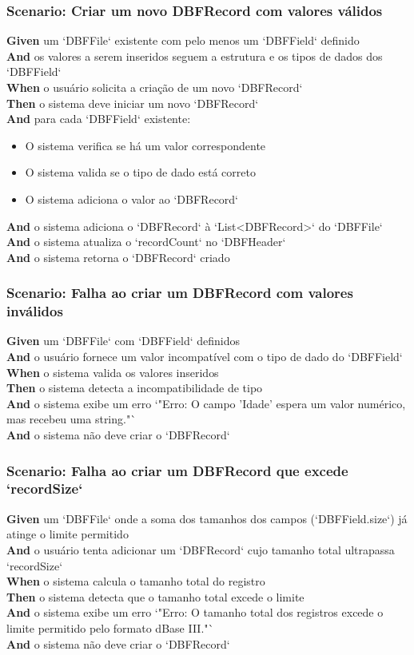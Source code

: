 \subsubsection{Scenario: Criar um novo DBFRecord com valores válidos}
\textbf{Given} um `DBFFile` existente com pelo menos um `DBFField` definido \\
\textbf{And} os valores a serem inseridos seguem a estrutura e os tipos de dados dos `DBFField` \\
\textbf{When} o usuário solicita a criação de um novo `DBFRecord` \\
\textbf{Then} o sistema deve iniciar um novo `DBFRecord` \\
\textbf{And} para cada `DBFField` existente:
\begin{itemize}
    \item O sistema verifica se há um valor correspondente
    \item O sistema valida se o tipo de dado está correto
    \item O sistema adiciona o valor ao `DBFRecord`
\end{itemize}
\textbf{And} o sistema adiciona o `DBFRecord` à `List<DBFRecord>` do `DBFFile` \\
\textbf{And} o sistema atualiza o `recordCount` no `DBFHeader` \\
\textbf{And} o sistema retorna o `DBFRecord` criado

\subsubsection{Scenario: Falha ao criar um DBFRecord com valores inválidos}
\textbf{Given} um `DBFFile` com `DBFField` definidos \\
\textbf{And} o usuário fornece um valor incompatível com o tipo de dado do `DBFField` \\
\textbf{When} o sistema valida os valores inseridos \\
\textbf{Then} o sistema detecta a incompatibilidade de tipo \\
\textbf{And} o sistema exibe um erro `"Erro: O campo 'Idade' espera um valor numérico, mas recebeu uma string."` \\
\textbf{And} o sistema não deve criar o `DBFRecord`

\subsubsection{Scenario: Falha ao criar um DBFRecord que excede `recordSize`}
\textbf{Given} um `DBFFile` onde a soma dos tamanhos dos campos (`DBFField.size`) já atinge o limite permitido \\
\textbf{And} o usuário tenta adicionar um `DBFRecord` cujo tamanho total ultrapassa `recordSize` \\
\textbf{When} o sistema calcula o tamanho total do registro \\
\textbf{Then} o sistema detecta que o tamanho total excede o limite \\
\textbf{And} o sistema exibe um erro `"Erro: O tamanho total dos registros excede o limite permitido pelo formato dBase III."` \\
\textbf{And} o sistema não deve criar o `DBFRecord`

